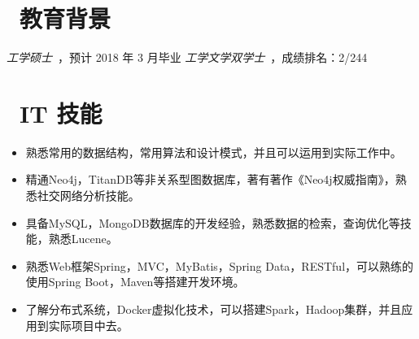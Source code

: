 \documentclass{resume}
\begin{document}



 
\section{\faGraduationCap\  教育背景}
\textit{工学硕士}\ ，预计 2018 年 3 月毕业
\textit{工学文学双学士}\ ，成绩排名：2/244

\section{\faCogs\ IT 技能}
\begin{itemize}[parsep=0.5ex]
  \item 熟悉常用的数据结构，常用算法和设计模式，并且可以运用到实际工作中。
  \item 精通Neo4j，TitanDB等非关系型图数据库，著有著作《Neo4j权威指南》，熟悉社交网络分析技能。
  \item 具备MySQL，MongoDB数据库的开发经验，熟悉数据的检索，查询优化等技能，熟悉Lucene。
  \item 熟悉Web框架Spring，MVC，MyBatis，Spring Data，RESTful，可以熟练的使用Spring Boot，Maven等搭建开发环境。
  \item 了解分布式系统，Docker虚拟化技术，可以搭建Spark，Hadoop集群，并且应用到实际项目中去。
\end{itemize}
\end{document}
